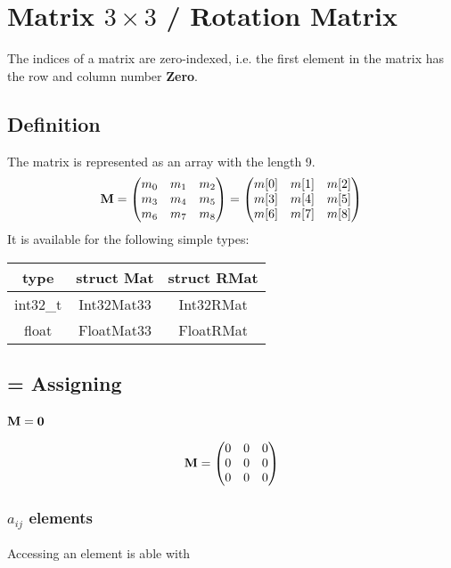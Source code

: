 \section{Matrix $3\times3$ / Rotation Matrix}
The indices of a matrix are zero-indexed, i.e. the first element in the matrix has the row and column number \textbf{Zero}.
\subsection{Definition}
The matrix is represented as an array with the length 9.
\begin{equation}
\mathbf{M} = \begin{pmatrix}
m_0 & m_1 & m_2 \\
m_3 & m_4 & m_5 \\
m_6 & m_7 & m_8
\end{pmatrix} = \begin{pmatrix}
m[0] & m[1] & m[2] \\
m[3] & m[4] & m[5] \\
m[6] & m[7] & m[8]
\end{pmatrix}
\end{equation}
It is available for the following simple types:\\
\begin{tabular}{c|c|c}
type		& struct Mat	& struct RMat	\\ \hline
int32\_t	& Int32Mat33	& Int32RMat		\\
float		& FloatMat33	& FloatRMat
\end{tabular}



\subsection{= Assigning}
\subsubsection*{$\mathbf{M} = \mathbf{0}$}
\begin{equation}
\mathbf{M} = \begin{pmatrix}
0 & 0 & 0 \\
0 & 0 & 0 \\
0 & 0 & 0
\end{pmatrix}
\end{equation}

\subsubsection*{$a_{ij}$ elements}
Accessing an element is able with

